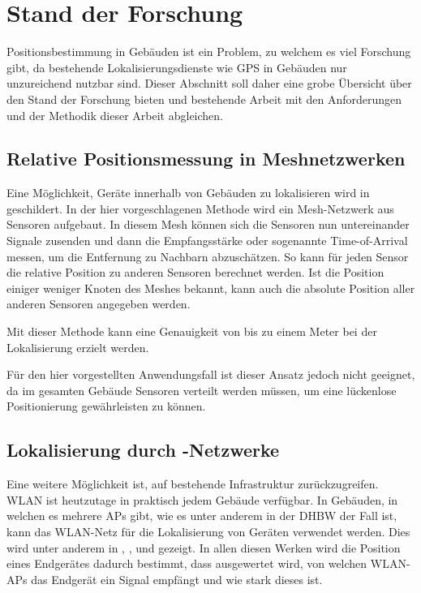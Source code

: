 \section{Stand der Forschung} \label{sec:stand-der-forschung}

Positionsbestimmung in Gebäuden ist ein Problem, zu welchem es viel Forschung gibt, da bestehende
Lokalisierungsdienste wie \gls{GPS} in Gebäuden nur unzureichend nutzbar sind. Dieser Abschnitt soll
daher eine grobe Übersicht über den Stand der Forschung bieten und bestehende Arbeit mit den
Anforderungen und der Methodik dieser Arbeit abgleichen.

\subsection{Relative Positionsmessung in Meshnetzwerken}

Eine Möglichkeit, Geräte innerhalb von Gebäuden zu lokalisieren wird in \cite{Patwari2003}
geschildert. In der hier vorgeschlagenen Methode wird ein \gls{Mesh-Netzwerk} aus Sensoren aufgebaut.
In diesem Mesh können sich die Sensoren nun untereinander Signale zusenden und dann die
Empfangsstärke oder sogenannte Time-of-Arrival messen, um die Entfernung zu Nachbarn abzuschätzen.
So kann für jeden Sensor die relative Position zu anderen Sensoren berechnet werden.
Ist die Position einiger weniger Knoten des Meshes bekannt, kann auch die absolute Position aller
anderen Sensoren angegeben werden.

Mit dieser Methode kann eine Genauigkeit von bis zu einem Meter bei der Lokalisierung erzielt
werden.

Für den hier vorgestellten Anwendungsfall ist dieser Ansatz jedoch nicht geeignet, da im gesamten
Gebäude Sensoren verteilt werden müssen, um eine lückenlose Positionierung gewährleisten zu können.

\subsection{Lokalisierung durch -Netzwerke}

Eine weitere Möglichkeit ist, auf bestehende Infrastruktur zurückzugreifen. \Gls{WLAN} ist
heutzutage in praktisch jedem Gebäude verfügbar.
In Gebäuden, in welchen es mehrere \glspl{AP} gibt, wie es unter anderem in der \gls{DHBW} der Fall
ist, kann das \gls{WLAN}-Netz für die Lokalisierung von Geräten verwendet werden. Dies wird unter
anderem in \cite{Xiang2004}, \cite{Dong2009}, \cite{Paschalidis2009} und \cite{Liang2009} gezeigt.
In allen diesen Werken wird die Position eines Endgerätes dadurch bestimmt, dass ausgewertet wird,
von welchen \gls{WLAN}-\glspl{AP} das Endgerät ein Signal empfängt und wie stark dieses ist.

